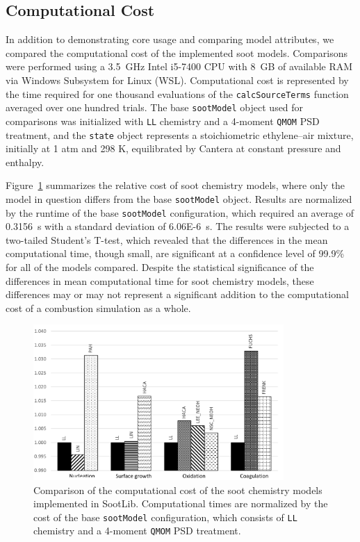 \documentclass[preprint,letterpaper]{elsarticle}
\begin{document}



\subsection{Computational Cost}
\label{ss:cost}

In addition to demonstrating core usage and comparing model attributes, we compared the computational cost of the implemented soot models. Comparisons were performed using a 3.5~\si{GHz} Intel i5-7400 CPU with 8~\si{GB} of available RAM via Windows Subsystem for Linux (WSL). Computational cost is represented by the time required for one thousand evaluations of the \texttt{calcSourceTerms} function averaged over one hundred trials. The base \texttt{sootModel} object used for comparisons was initialized with \texttt{LL} chemistry and a 4-moment \texttt{QMOM} PSD treatment, and the \texttt{state} object represents a stoichiometric ethylene–air mixture, initially at 1 \si{atm} and 298 \si{K}, equilibrated by Cantera at constant pressure and enthalpy.

Figure~\ref{f:cost_chem} summarizes the relative cost of soot chemistry models, where only the model in question differs from the base \texttt{sootModel} object. Results are normalized by the runtime of the base \texttt{sootModel} configuration, which required an average of 0.3156~\si{s} with a standard deviation of \num{6.06E-6}~\si{s}. The results were subjected to a two-tailed Student's T-test, which revealed that the differences in the mean computational time, though small, are significant at a confidence level of 99.9\% for all of the models compared. Despite the statistical significance of the differences in mean computational time for soot chemistry models, these differences may or may not represent a significant addition to the computational cost of a combustion simulation as a whole.

\begin{figure}[ht]
    \caption{Comparison of the computational cost of the soot chemistry models implemented in SootLib. Computational times are normalized by the cost of the base \texttt{sootModel} configuration, which consists of \texttt{LL} chemistry and a 4-moment \texttt{QMOM} PSD treatment.}
    \label{f:cost_chem}
    \centering
    \includegraphics[width=0.85\textwidth]{../figures/comp_cost_chem}
\end{figure}
\end{document}
